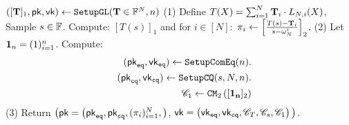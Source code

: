 \begin{footnotesize}
\begin{algorithm}[bt]
$ ([{{\mathbf {T}}}]_1, \mathsf{pk},\mathsf{vk}) \leftarrow {\texttt{SetupGL}}({{\mathbf {T}}} \in \mathbb{F}^N, n)$
\newline
(1) 
Define ${T}(X) = \sum_{i=1}^N {{\mathbf {T}}}_i \cdot L_{N,i}(X)$,
Sample $s\in \mathbb{F}$. \newline
Compute: $[T(s)]_1$ and 
 	for $i\in [N]:$ $\pi_i \leftarrow
	\left[\frac{T(s) - {{\mathbf {T}}}_i}{s-\omega_{N}^i}\right]_2$. \newline
(2) Let ${{\mathbf {1}}}_n = (1)_{i=1}^n$.
Compute:
 \begin{eqnarray*}
  & & (\mathsf{pk}_{{\tt eq}}, \mathsf{vk}_{{\tt eq}}) \leftarrow
	{\texttt{SetupComEq}}(n). \\
  & &
	(\mathsf{pk}_{{\tt cq}}, \mathsf{vk}_{{\tt cq}}) \leftarrow
	{\texttt{SetupCQ}}(s, N, n). \\
  & &
	{\mathscr{C}}_{{\tt 1}} \leftarrow {\mathtt{CM}}_2\left([{{\mathbf {1_n}}}]_2 \right)
 \end{eqnarray*}
(3) Return 
$\big(\mathsf{pk} = \left(\mathsf{pk}_{{\tt eq}}, \mathsf{pk}_{{\tt cq}}, (\pi_i)_{i=1}^N,  \right)$, 
$\mathsf{vk} = \left(\mathsf{vk}_{{\tt eq}}, \mathsf{vk}_{{\tt cq}}, {\mathscr{C}}_{T}, {\mathscr{C}}_{s}, {\mathscr{C}}_{1} \right) \big)$. \newline



\end{algorithm}
\end{footnotesize}
